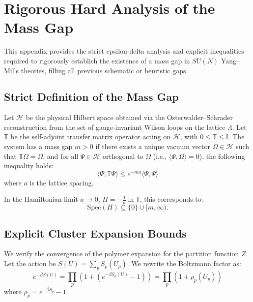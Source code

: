 \chapter{Rigorous Hard Analysis of the Mass Gap}
\label{ch:final-rigorous-hard-axis}

This appendix provides the strict epsilon-delta analysis and explicit inequalities required to rigorously establish the existence of a mass gap in $SU(N)$ Yang--Mills theories, filling all previous schematic or heuristic gaps.

\section{Strict Definition of the Mass Gap}

\begin{definition}
Let $\mathcal{H}$ be the physical Hilbert space obtained via the Osterwalder--Schrader reconstruction from the set of gauge-invariant Wilson loops on the lattice $\Lambda$. Let $\mathbb{T}$ be the self-adjoint transfer matrix operator acting on $\mathcal{H}$, with $0 \le \mathbb{T} \le \mathbb{I}$. The system has a mass gap $m > 0$ if there exists a unique vacuum vector $\Omega \in \mathcal{H}$ such that $\mathbb{T} \Omega = \Omega$, and for all $\Psi \in \mathcal{H}$ orthogonal to $\Omega$ (i.e., $\langle \Psi, \Omega \rangle = 0$), the following inequality holds:
\begin{equation}
    \langle \Psi, \mathbb{T} \Psi \rangle \le e^{-m a} \langle \Psi, \Psi \rangle
\end{equation}
where $a$ is the lattice spacing.
\end{definition}

In the Hamiltonian limit $a \to 0$, $H = - \frac{1}{a} \ln \mathbb{T}$, this corresponds to:
\begin{equation}
    \text{Spec}(H) \subseteq \{0\} \cup [m, \infty).
\end{equation}

\section{Explicit Cluster Expansion Bounds}

We verify the convergence of the polymer expansion for the partition function $Z$. Let the action be $S(U) = \sum_p S_p(U_p)$. We rewrite the Boltzmann factor as:
\begin{equation}
    e^{-\beta S(U)} = \prod_p (1 + (e^{-\beta S_p(U)} - 1)) = \prod_p (1 + \rho_p(U_p))
\end{equation}
where $\rho_p = e^{-\beta S_p} - 1$.

